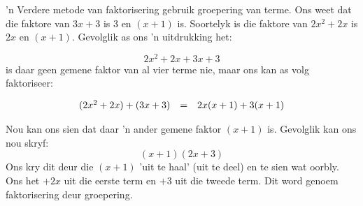 ’n Verdere metode van faktorisering gebruik groepering van terme. Ons weet dat die faktore van $3x+3$ is $3$ en $(x+1)$ is. Soortelyk is die faktore van $2{x}^{2}+2x$ is $2x$ en $(x+1)$. Gevolglik as ons ’n uitdrukking het:

\begin{equation*}
2{x}^{2}+2x+3x+3
\end{equation*}
is daar geen gemene faktor van al vier terme nie, maar ons kan as volg faktoriseer:
\nopagebreak\noindent{}

\begin{equation*}
\begin{array}{ccl}
(2{x}^{2}+2x)+(3x+3) &=& 2x(x+1)+3(x+1) \hfill \hfill
\end{array}
\end{equation*}


Nou kan ons sien dat daar ’n ander gemene faktor $(x+1)$ is. Gevolglik kan ons nou skryf: 
\begin{equation*}
(x+1)(2x+3)
\end{equation*}
Ons kry dit deur die $(x+1)$ ’uit te haal’ (uit te deel) en te sien wat oorbly. Ons het $+2x$ uit die eerste term en $+3$ uit die tweede term. Dit word genoem faktorisering deur groepering.\par 



